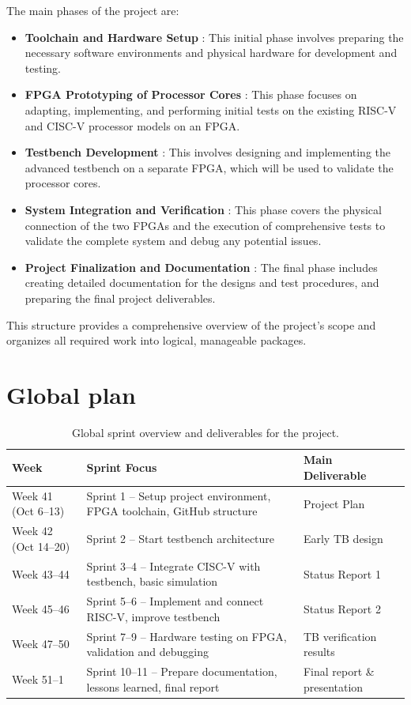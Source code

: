 \documentclass[10pt]{article}
\begin{document}
The main phases of the project are:
\begin{itemize}
  \item \textbf{Toolchain and Hardware Setup} : This initial phase involves preparing the necessary software environments and physical hardware for development and testing.
  \item \textbf{FPGA Prototyping of Processor Cores} : This phase focuses on adapting, implementing, and performing initial tests on the existing RISC-V and CISC-V processor models on an FPGA.
  \item \textbf{Testbench Development} : This involves designing and implementing the advanced testbench on a separate FPGA, which will be used to validate the processor cores.
  \item \textbf{System Integration and Verification} : This phase covers the physical connection of the two FPGAs and the execution of comprehensive tests to validate the complete system and debug any potential issues.
  \item \textbf{Project Finalization and Documentation} : The final phase includes creating detailed documentation for the designs and test procedures, and preparing the final project deliverables.
\end{itemize}
This structure provides a comprehensive overview of the project's scope and organizes all required work into logical, manageable packages.


\section{Global plan}

\begin{table}[h!]
\centering
\begin{tabular}{|l|l|l|}
\hline
\textbf{Week} & \textbf{Sprint Focus} & \textbf{Main Deliverable} \\ \hline
Week 41 (Oct 6–13) & Sprint 1 – Setup project environment, FPGA toolchain, GitHub structure & Project Plan \\ \hline
Week 42 (Oct 14–20) & Sprint 2 – Start testbench architecture & Early TB design \\ \hline
Week 43–44 & Sprint 3–4 – Integrate CISC-V with testbench, basic simulation & Status Report 1 \\ \hline
Week 45–46 & Sprint 5–6 – Implement and connect RISC-V, improve testbench & Status Report 2 \\ \hline
Week 47–50 & Sprint 7–9 – Hardware testing on FPGA, validation and debugging & TB verification results \\ \hline
Week 51–1 & Sprint 10–11 – Prepare documentation, lessons learned, final report & Final report \& presentation \\ \hline
\end{tabular}
\caption{Global sprint overview and deliverables for the project.}
\label{tab:sprint_overview}
\end{table}
\end{document}

